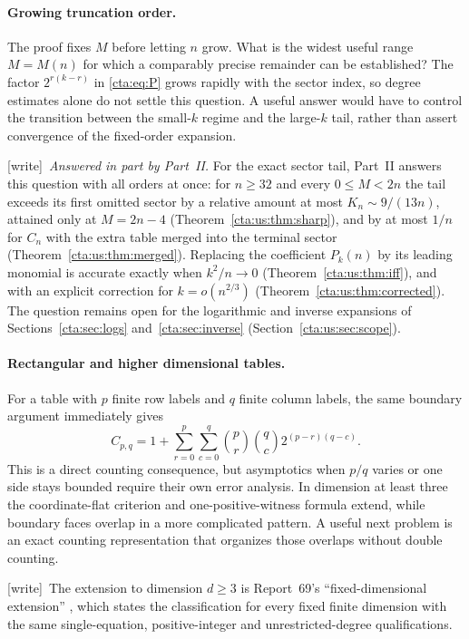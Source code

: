 \documentclass[11pt]{article}
\theoremstyle{definition}
\theoremstyle{remark}
\newcommand{\wtag}{\textup{[write]}}
\begin{document}
\paragraph{Growing truncation order.}
The proof fixes $M$ before letting $n$ grow. What is the widest useful
range $M=M(n)$ for which a comparably precise remainder can be established?
The factor $2^{r(k-r)}$ in \eqref{cta:eq:P} grows rapidly with the sector index,
so degree estimates alone do not settle this question. A useful answer
would have to control the transition between the small-$k$ regime and the
large-$k$ tail, rather than assert convergence of the fixed-order expansion.

\wtag\ \emph{Answered in part by Part~II.} For the exact sector tail, Part~II
answers this question with all orders at once: for $n\ge32$ and every
$0\le M<2n$ the tail exceeds its first omitted sector by a relative amount
at most $K_n\sim9/(13n)$, attained only at $M=2n-4$
(Theorem~\ref{cta:us:thm:sharp}), and by at most $1/n$ for $C_n$ with the
extra table merged into the terminal sector
(Theorem~\ref{cta:us:thm:merged}). Replacing the coefficient $P_k(n)$ by its
leading monomial is accurate exactly when $k^2/n\to0$
(Theorem~\ref{cta:us:thm:iff}), and with an explicit correction for
$k=o(n^{2/3})$ (Theorem~\ref{cta:us:thm:corrected}). The question remains
open for the logarithmic and inverse expansions of
Sections~\ref{cta:sec:logs} and~\ref{cta:sec:inverse}
(Section~\ref{cta:us:sec:scope}).

\paragraph{Rectangular and higher dimensional tables.}
For a table with $p$ finite row labels and $q$ finite column labels, the
same boundary argument immediately gives
\[
 C_{p,q}=1+\sum_{r=0}^p\sum_{c=0}^q
           \binom pr\binom qc2^{(p-r)(q-c)}.
\]
This is a direct counting consequence, but asymptotics when $p/q$ varies
or one side stays bounded require their own error analysis. In dimension
at least three the coordinate-flat criterion and one-positive-witness
formula extend, while boundary faces overlap in a more complicated pattern.
A useful next problem is an exact counting representation that organizes
those overlaps without double counting.

\wtag\ The extension to dimension $d\ge3$ is Report~69's ``fixed-dimensional
extension'' \cite{smc}, which states the classification for every fixed
finite dimension with the same single-equation, positive-integer and
unrestricted-degree qualifications.
\end{document}
